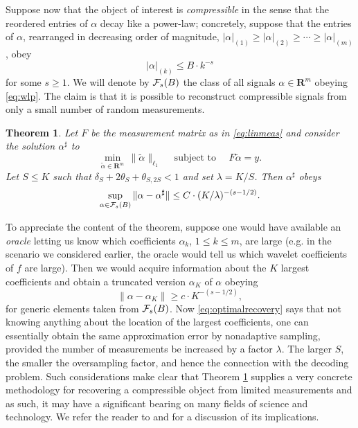 \documentclass[11pt]{article}
\def\R{{{\mathbf{R}}}} %
\newcommand{\<}{\langle}
\renewcommand{\>}{\rangle}
\newtheorem{theorem}{Theorem}[section]
\numberwithin{equation}{section}
\def\cF{{\cal F}}
\begin{document}
Suppose now that the object of interest is {\em compressible} in the
sense that the reordered entries of $\alpha$ decay like a power-law;
concretely, suppose that the entries of $\alpha$, rearranged in
decreasing order of magnitude, $|\alpha|_{(1)} \geq |\alpha|_{(2)} \geq
\cdots \geq |\alpha|_{(m)}$, obey 
\begin{equation}
\label{eq:wlp}
|\alpha|_{(k)} \leq B\cdot k^{-s}
\end{equation}
for some $s \geq 1$.  We will denote by $\cF_s(B)$ the class of all
signals $\alpha \in \R^m$ obeying \eqref{eq:wlp}. The claim is that it is
possible to reconstruct compressible signals from only a small number
of random measurements.
\begin{theorem}
\label{teo:optimalrecovery}
Let $F$ be the measurement matrix as in \eqref{eq:linmeas} and consider
the solution $\alpha^\sharp$ to
  \begin{equation}
    \label{eq:newP1}
\min_{\tilde \alpha \in \R^m} \, \|\tilde \alpha\|_{\ell_1} 
\quad \text{ subject to } \quad F \tilde \alpha = y.
  \end{equation}
  Let $S \le K$ such that $\delta_S + 2\theta_S + \theta_{S,2S} < 1$
  and set $\lambda = K/S$.  Then $\alpha^\sharp$ obeys
  \begin{equation}
    \label{eq:optimalrecovery}
   \sup_{\alpha \in \cF_s(B)}  \|\alpha - \alpha^\sharp\| \le C 
\cdot (K/\lambda)^{-(s-1/2)}.  
  \end{equation}
\end{theorem}
To appreciate the content of the theorem, suppose one would have
available an {\em oracle} letting us know which coefficients
$\alpha_k$, $1 \le k \le m$, are large (e.g. in the scenario we
considered earlier, the oracle would tell us which wavelet
coefficients of $f$ are large). Then we would acquire information
about the $K$ largest coefficients and obtain a truncated version
$\alpha_K$ of $\alpha$ obeying 
\[
\|\alpha - \alpha_K\| \ge c \cdot K^{-(s-1/2)},  
\] 
for generic elements taken from $\cF_s(B)$. Now
\eqref{eq:optimalrecovery} says that not knowing anything about the
location of the largest coefficients, one can essentially obtain the
same approximation error by nonadaptive sampling, provided the number
of measurements be increased by a factor $\lambda$. The larger $S$,
the smaller the oversampling factor, and hence the connection with the
decoding problem. Such considerations make clear that Theorem
\ref{teo:optimalrecovery} supplies a very concrete methodology for
recovering a compressible object from limited measurements and as
such, it may have a significant bearing on many fields of science and
technology. We refer the reader to \cite{OptimalRecovery} and
\cite{CompressedSensing} for a discussion of its implications.
\end{document}
